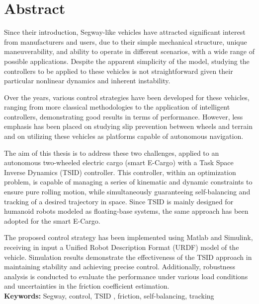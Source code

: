 \chapter*{Abstract} 
\label{ch:Abstract}


Since their introduction, Segway-like vehicles have attracted significant interest from manufacturers and users, due to their simple mechanical structure, unique maneuverability, and ability to operate in different scenarios, with a wide range of possible applications. Despite the apparent simplicity of the model, studying the controllers to be applied to these vehicles is not straightforward given their particular nonlinear dynamics and inherent instability. 

Over the years, various control strategies have been developed for these vehicles, ranging from more classical methodologies to the application of intelligent controllers, demonstrating good results in terms of performance. However, less emphasis has been placed on studying slip prevention between wheels and terrain and on utilizing these vehicles as platforms capable of autonomous navigation.

The aim of this thesis is to address these two challenges, applied to an autonomous two-wheeled electric cargo (smart E-Cargo) with a Task Space Inverse Dynamics (TSID) controller.
This controller, within an optimization problem, is capable of managing a series of kinematic and dynamic constraints to ensure pure rolling motion, while simultaneously guaranteeing self-balancing and tracking of a desired trajectory in space. Since TSID is mainly designed for humanoid robots modeled as floating-base systems, the same approach has been adopted for the smart E-Cargo.

The proposed control strategy has been implemented using Matlab and Simulink, receiving in input a Unified Robot Description Format (URDF) model of the vehicle. Simulation results demonstrate the effectiveness of the TSID approach in maintaining stability and achieving precise control. Additionally, robustness analysis is conducted to evaluate the performance under various load conditions and uncertainties in the friction coefficient estimation.
\\
\textbf{Keywords:} Segway, control, TSID , friction, self-balancing, tracking %